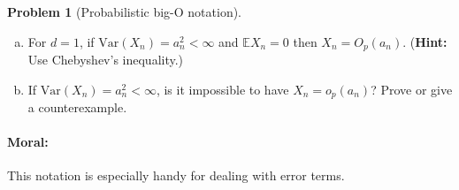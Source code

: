 \documentclass{article}
\newcommand{\EE}{\mathbb{E}}
\theoremstyle{definition}
\newtheorem{problem}{Problem}
\begin{document}
\begin{problem}[Probabilistic big-O notation]
\begin{enumerate}[(a)]
\item For $d=1$, if $\text{Var}(X_n) = a_n^2 < \infty$ and $\EE X_n = 0$ then $X_n = O_p(a_n)$. ({\bf Hint:} Use Chebyshev's inequality.)



\item If $\text{Var}(X_n) = a_n^2 < \infty$, is it impossible to have $X_n = o_p(a_n)$? Prove or give a counterexample.



\end{enumerate}

\paragraph{Moral:} This notation is especially handy for dealing with error terms. 

\end{problem}




\end{document}
